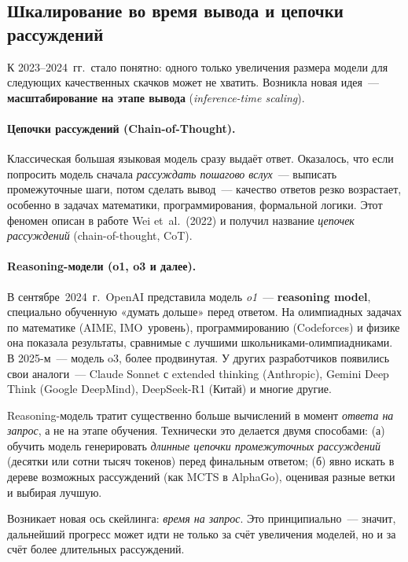 \subsection{Шкалирование во время вывода и цепочки рассуждений}
\label{ssec:reasoning}

К 2023--2024~гг.\ стало понятно: одного только увеличения размера
модели для следующих качественных скачков может не хватить. Возникла
новая идея~--- \textbf{масштабирование на этапе вывода}
(\emph{inference-time scaling}).

\paragraph{Цепочки рассуждений (Chain-of-Thought).}
Классическая большая языковая модель сразу выдаёт ответ. Оказалось,
что если попросить модель сначала \emph{рассуждать пошагово вслух}~---
выписать промежуточные шаги, потом сделать вывод~--- качество ответов
резко возрастает, особенно в задачах математики, программирования,
формальной логики. Этот феномен описан в работе Wei et~al.~(2022) и
получил название \emph{цепочек рассуждений} (chain-of-thought, CoT).

\paragraph{Reasoning-модели (o1, o3 и далее).}
В сентябре~2024~г.\ OpenAI представила модель \emph{o1}~---
\textbf{reasoning model}, специально обученную «думать дольше» перед
ответом. На олимпиадных задачах по математике (AIME, IMO~уровень),
программированию (Codeforces) и физике она показала результаты,
сравнимые с лучшими школьниками-олимпиадниками. В 2025-м~--- модель
o3, более продвинутая. У других разработчиков появились свои аналоги~---
Claude Sonnet с extended thinking (Anthropic), Gemini Deep Think
(Google DeepMind), DeepSeek-R1 (Китай) и многие другие.

\begin{notebox}[title={Что значит «думать дольше»}]
Reasoning-модель тратит существенно больше вычислений в момент
\emph{ответа на запрос}, а не на этапе обучения. Технически это
делается двумя способами: (а) обучить модель генерировать
\emph{длинные цепочки промежуточных рассуждений} (десятки или сотни
тысяч токенов) перед финальным ответом; (б) явно искать в дереве
возможных рассуждений (как MCTS в AlphaGo), оценивая разные ветки и
выбирая лучшую.

Возникает новая ось скейлинга: \emph{время на запрос}. Это
принципиально~--- значит, дальнейший прогресс может идти не только за
счёт увеличения моделей, но и за счёт более длительных рассуждений.
\end{notebox}

